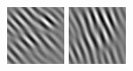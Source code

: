 \begin{figure}[ht]
\begin{center}
  \includegraphics[width=\columnwidth/9]{ch4/figures/real_2_6.jpg}
  \includegraphics[width=\columnwidth/9]{ch4/figures/real_2_7.jpg}\\

\end{center}
\end{figure}
